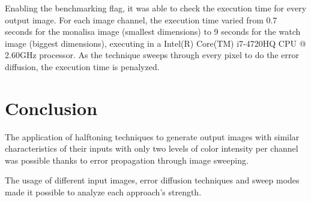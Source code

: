 \documentclass[]{IEEEtran}
\begin{document}
Enabling the benchmarking flag, it was able to check the execution time for every output image. For each image channel, the execution time varied from 0.7 seconds for the monalisa image (smallest dimensions) to 9 seconds for the watch image (biggest dimensions), executing in a Intel(R) Core(TM) i7-4720HQ CPU @ 2.60GHz processor. As the technique sweeps through every pixel to do the error diffusion, the execution time is penalyzed.


\section{Conclusion}
The application of halftoning techniques to generate output images with similar characteristics of their inputs with only two levels of color intensity per channel was possible thanks to error propagation through image sweeping.

The usage of different input images, error diffusion techniques and sweep modes made it possible to analyze each approach's strength.

 

\end{document}
